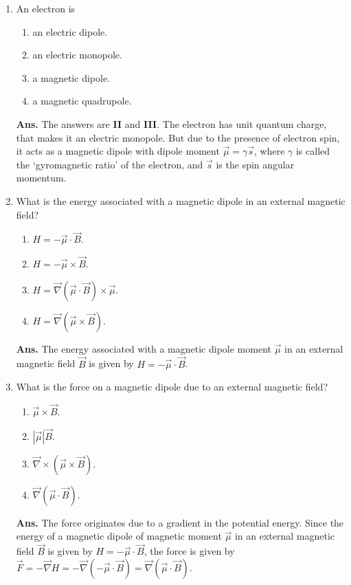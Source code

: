 \documentclass[12pt]{article}
\newcommand\ls{\left |}
\newcommand\rs{\right |}
\newcommand\tbf[1]{\textbf{#1}}
\newcommand\tans{\tbf{Ans. }}
\newcommand\Del{\nabla}
\begin{document}
\begin{enumerate}[\bf 1.]
\item An electron is
\begin{enumerate}[\bf I.]
\item an electric dipole.
\item an electric monopole.
\item a magnetic dipole.
\item a magnetic quadrupole.
\end{enumerate}
\vspace{0.5cm}
\tans The answers are \tbf{II} and \tbf{III}. The electron has unit quantum charge, that makes it an electric monopole. But due to the presence of electron spin, it acts as a magnetic dipole with dipole moment $\vec{\mu} = \gamma \vec{s}$, where $\gamma$ is called the `gyromagnetic ratio' of the electron, and $\vec{s}$ is the spin angular momentum.
\vspace{1.5cm}
\item What is the energy associated with a magnetic dipole in an external magnetic field?
\begin{enumerate}[\bf I.]
\item $H = - \vec{\mu} \cdot \vec{B}$.
\item $H = - \vec{\mu} \times \vec{B}$.
\item $H = \vec{\Del}\left(\vec{\mu}\cdot\vec{B}\right)\times\vec{\mu}$.
\item $H = \vec{\Del}\left(\vec{\mu}\times\vec{B}\right) $.
\end{enumerate}
\vspace{0.5cm}
\tans The energy associated with a magnetic dipole moment $\vec{\mu}$ in an external magnetic field $\vec{B}$ is given by $H = - \vec{\mu} \cdot \vec{B}$.
\vspace{1cm}
\item What is the force on a magnetic dipole due to an external magnetic field?
\begin{enumerate}[\bf I.]
\item $\vec{\mu}\times\vec{B}$.
\item $\ls \vec{\mu} \rs \vec{B}$.
\item $\vec{\Del}\times\left(\vec{\mu}\times\vec{B}\right)$.
\item $\vec{\Del}\left(\vec{\mu}\cdot\vec{B}\right)$.
\end{enumerate}
\vspace{0.5cm}
\tans The force originates due to a gradient in the potential energy. Since the energy of a magnetic dipole of magnetic moment $\vec{\mu}$ in an external magnetic field $\vec{B}$ is given by $H = - \vec{\mu} \cdot \vec{B}$, the force is given by $\vec{F} = -\vec{\Del}H = -\vec{\Del}\left(-\vec{\mu}\cdot\vec{B}\right) = \vec{\Del}\left(\vec{\mu}\cdot\vec{B}\right)$.

\end{enumerate}
\end{document}

